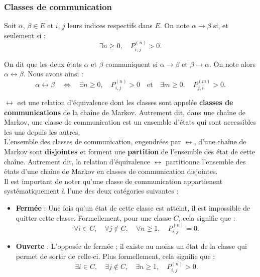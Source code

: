 \documentclass{article}
\begin{document}

\subsubsection{Classes de communication}

Soit $\alpha$, $\beta \in E$ et $i$, $j$ leurs indices respectifs dans $E$. On note $\alpha \rightarrow \beta$ si, et seulement si :
\[
\exists n \geq 0, \quad P_{i,j}^{(n)} > 0.
\]

On dit que les deux états $\alpha$ et $\beta$ communiquent si $\alpha \rightarrow \beta$ et $\beta \rightarrow \alpha$. On note alors $\alpha \leftrightarrow \beta$. Nous avons ainsi :
\[
\alpha \leftrightarrow \beta \quad \iff \quad \exists n \geq 0, \quad P_{i,j}^{(n)} > 0 \quad \text{et} \quad \exists m \geq 0, \quad P_{j,i}^{(m)} > 0.
\]

$\leftrightarrow$ est une relation d'équivalence dont les classes sont appelée \textbf{classes de communications} de la chaîne de Markov. Autrement dit, dans une chaîne de Markov, une classe de communication est un ensemble d'états qui sont accessibles les uns depuis les autres. \\

L'ensemble des classes de communication, engendrées par $\leftrightarrow$, d'une chaîne de Markov sont \textbf{disjointes} et forment une \textbf{partition} de l'ensemble des état de cette chaîne.
Autrement dit, la relation d'équivalence $\leftrightarrow$ partitionne l'ensemble des états d'une chaîne de Markov en classes de communication disjointes. \\ %

Il est important de noter qu'une classe de communication appartienent systématiquement à l'une des deux catégories suivantes :
\begin{itemize}
\item \textbf{Fermée} : Une fois qu'un état de cette classe est atteint, il est impossible de quitter cette classe. Formellement, pour une classe $C$, cela signifie que :
  \[
  \forall i \in C, \quad \forall j \notin C, \quad \forall n \geq 1, \quad P_{i,j}^{(n)} = 0.
  \]
\item \textbf{Ouverte} : L'opposée de fermée ; il existe au moins un état de la classe qui permet de sortir de celle-ci. Plus formellement, cela signifie que :
  \[
  \exists i \in C, \quad \exists j \notin C, \quad \exists n \geq 1, \quad P_{i,j}^{(n)} > 0.
  \]
\end{itemize}
\end{document}
